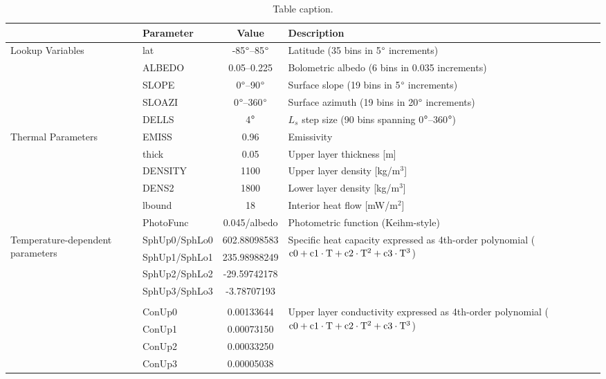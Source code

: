 \begin{table}[htb]
\caption{Table caption.}
\centering
\begin{tabular}{l l c l}
\hline
& Parameter & Value & Description  \\
\hline
\multirow{5}{6em}{Lookup Variables} 
 & lat  & -85$\degree$--85$\degree$ & Latitude (35 bins in 5$\degree$ increments)  \\
 & ALBEDO  & 0.05--0.225 & Bolometric albedo (6 bins in 0.035 increments)  \\
 & SLOPE  & 0$\degree$--90$\degree$ & Surface slope (19 bins in 5$\degree$ increments)   \\
 & SLOAZI  & 0$\degree$--360$\degree$ & Surface azimuth (19 bins in 20$\degree$ increments)   \\
 & DELLS  & 4$\degree$ & $L_s$ step size (90 bins spanning 0$\degree$--360$\degree$) \\
\hline
\multirow{8}{6em}{Thermal Parameters} 
 & EMISS  & 0.96 & Emissivity  \\
 & thick  & 0.05 & Upper layer thickness [m] \\
 & DENSITY  & 1100 & Upper layer density [kg/m$^3$]  \\
 & DENS2  & 1800 & Lower layer density [kg/m$^3$]  \\
 & lbound  & 18 & Interior heat flow [mW/m$^2$]   \\
 & \multirow{3}{*}{PhotoFunc}  & \multirow{3}{*}{0.045/albedo} & \multirow{3}{20em}{Photometric function (Keihm-style)} \\
 & & & \\
 & & & \\
\hline
\multirow{12}{6em}{Temperature-dependent parameters}
 & SphUp0/SphLo0  & 602.88098583 & \multirow{4}{20em}{Specific heat capacity expressed as 4th-order polynomial ($\rm c0 + c1 \cdot T + c2 \cdot T^2 + c3 \cdot T^3$)} \\
 & SphUp1/SphLo1  & 235.98988249 &  \\
 & SphUp2/SphLo2  & -29.59742178 &  \\
 & SphUp3/SphLo3  & -3.78707193  & \\
 \\
 & ConUp0  & 0.00133644 &  \multirow{4}{20em}{Upper layer conductivity expressed as 4th-order polynomial ($\rm c0 + c1 \cdot T + c2 \cdot T^2 + c3 \cdot T^3$)} \\
 & ConUp1  & 0.00073150 &  \\
 & ConUp2  & 0.00033250 &  \\
 & ConUp3  & 0.00005038 &  \\

\end{tabular}
\end{table}
